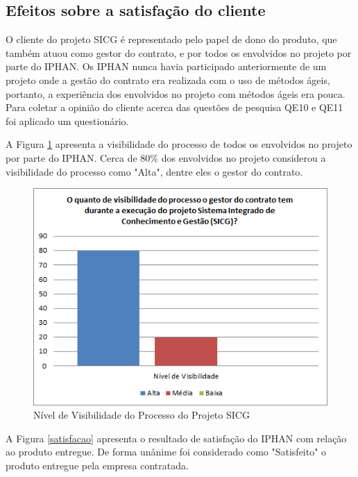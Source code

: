 \subsection[Efeitos sobre a satisfação do cliente]{Efeitos sobre a satisfação do cliente}

O cliente do projeto SICG é representado pelo papel de dono do produto, que também atuou como gestor do contrato, e por todos os envolvidos no projeto por parte do IPHAN. Os IPHAN nunca havia participado anteriormente de um projeto onde a gestão do contrato era realizada com o uso de métodos ágeis, portanto, a experiência dos envolvidos no projeto com métodos ágeis era pouca. Para coletar a opinião do cliente acerca das questões de pesquisa QE10  e QE11 foi aplicado um questionário.

A Figura \ref{visibilidade} apresenta a visibilidade do processo de todos os envolvidos no projeto por parte do IPHAN. Cerca de 80\% dos envolvidos no projeto considerou a visibilidade do processo como "Alta", dentre eles o gestor do contrato.

\begin{figure}[H]
		\centering
			\includegraphics[scale=1.0]{figuras/visibilidade.png}
		\caption{Nível de Visibilidade do Processo do Projeto SICG}
		\label{visibilidade}
\end{figure}

A Figura \ref{satisfacao} apresenta o resultado de satisfação do IPHAN com relação ao produto entregue. De forma unânime foi considerado como "Satisfeito" o produto entregue pela empresa contratada. 

